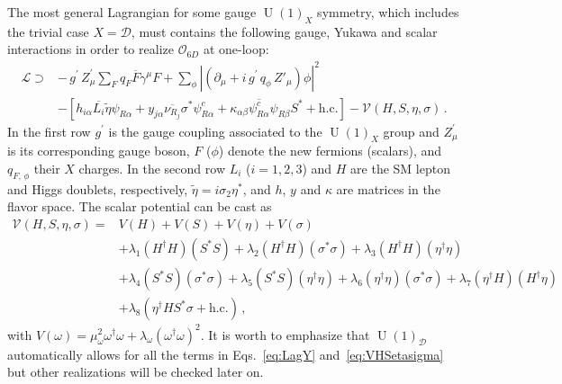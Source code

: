 \documentclass[12pt]{article}
\begin{document}
The most general Lagrangian for some gauge $\operatorname{U}(1)_X$ symmetry, which includes the trivial case $X=\mathcal{D}$, must contains the following gauge, Yukawa and scalar interactions in
order to realize $\mathcal{O}_{6D}$ at one-loop:
%
\begin{align}
\label{eq:LagY}
    \mathcal{L} \supset& -\,g^{\prime}\,Z_\mu^\prime\sum_{F}q_{F}\overline{F} \gamma^\mu F+\sum_{\phi}\left|\left( \partial_\mu +i\,g^{\prime}\,q_\phi\,Z'_\mu \right) \phi\right|^2\nonumber\\
    &-[ 
    h_{i\alpha} \overline{L_{i}} \tilde{\eta} \psi_{R\alpha} +  y_{j\alpha} \overline{\nu_{R_{j}}} \sigma^* \psi^c_{R\alpha} + \kappa_{\alpha\beta} \overline{\psi^{c}_{R\alpha}} \psi_{R\beta} S^* + \text{h.c.}] - \mathcal{V}(H, S, \eta, \sigma)\,.
\end{align}
%
In the first row $g^{\prime}$ is the gauge coupling associated to the $\operatorname{U}(1)_X$ group and $Z_\mu^\prime$ is its corresponding gauge boson, $F$ ($\phi$) denote the new fermions (scalars), and $q_{F,\,\phi}$ their $X$ charges. In the second row
$L_{i}$ ($i=1,2,3$) and $H$ are the SM lepton and Higgs doublets, respectively,  $\widetilde{\eta} = i \sigma_2 \eta^*$, and $h$, $y$ and $\kappa$ are matrices in the flavor space. 
The scalar potential can be cast as
%
\begin{align}
  \label{eq:VHSetasigma}
    \mathcal{V}(H, S, \eta, \sigma) = & V(H) + V(S) + V(\eta) + V(\sigma) \nonumber\\
    &+  \lambda_{1} (H^{\dagger} H ) (S^{*} S) + \lambda_{2} (H^{\dagger} H ) (\sigma^{*} \sigma ) + \lambda_{3} (H^{\dagger} H ) (\eta^{\dagger} \eta )\nonumber\\
    &+ \lambda_{4} (S^{*} S) (\sigma^{*} \sigma ) + \lambda_{5} (S^{*} S) (\eta^{\dagger} \eta ) + \lambda_{6} (\eta^{\dagger} \eta ) (\sigma^{*} \sigma ) + \lambda_{7} (\eta^{\dagger} H ) (H^{\dagger} \eta ) \nonumber\\
    &+ \lambda_{8} (\eta^{\dagger} H S^{*} \sigma + \text{h.c.})\,,
\end{align}
%
%
%
with $V(\omega) = \mu^{2}_{\omega} \omega^{\dagger} \omega + \lambda_{\omega} (\omega^{\dagger} \omega)^{2}$. It is worth to emphasize that $\operatorname{U}(1)_{\mathcal{D}}$ automatically allows for all the terms in Eqs.~\eqref{eq:LagY} and~\eqref{eq:VHSetasigma} but other realizations will be checked later on.
\end{document}
